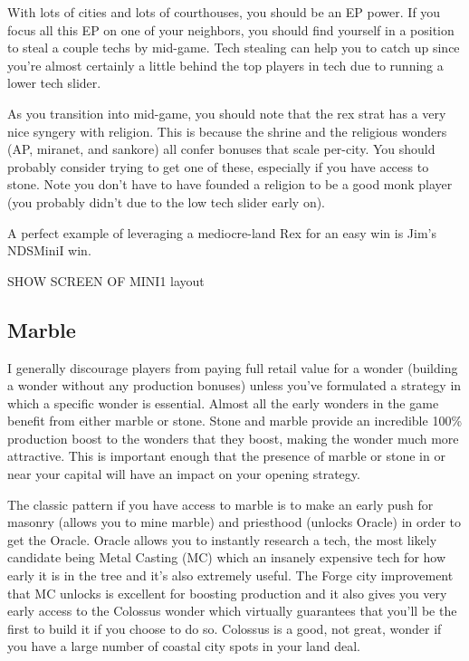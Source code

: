 \documentclass[10pt]{article}
\begin{document}
With lots of cities and lots of courthouses, you should be an EP
power. If you focus all this EP on one of your neighbors, you should
find yourself in a position to steal a couple techs by mid-game. Tech
stealing can help you to catch up since you're almost certainly a
little behind the top players in tech due to running a lower tech
slider.

As you transition into mid-game, you should note that the rex strat
has a very nice syngery with religion. This is because the shrine and
the religious wonders (AP, miranet, and sankore) all confer bonuses
that scale per-city. You should probably consider trying to get one of
these, especially if you have access to stone. Note you don't have to
have founded a religion to be a good monk player (you probably didn't
due to the low tech slider early on).

A perfect example of leveraging a mediocre-land Rex for an easy win is Jim's NDSMiniI win.

SHOW SCREEN OF MINI1 layout

\subsection*{Marble}

I generally discourage players from paying full retail value for a
wonder (building a wonder without any production bonuses) unless
you've formulated a strategy in which a specific wonder is essential.
Almost all the early wonders in the game benefit from either marble or
stone. Stone and marble provide an incredible 100\% production boost
to the wonders that they boost, making the wonder much more
attractive. This is important enough that the presence of marble or
stone in or near your capital will have an impact on your opening
strategy.

The classic pattern if you have access to marble is to make an early
push for masonry (allows you to mine marble) and priesthood (unlocks
Oracle) in order to get the Oracle. Oracle allows you to instantly
research a tech, the most likely candidate being Metal Casting (MC)
which an insanely expensive tech for how early it is in the tree and
it's also extremely useful. The Forge city improvement that MC unlocks
is excellent for boosting production and it also gives you very early
access to the Colossus wonder which virtually guarantees that you'll
be the first to build it if you choose to do so. Colossus is a good,
not great, wonder if you have a large number of coastal city spots in
your land deal.
\end{document}
